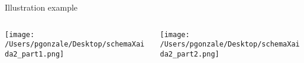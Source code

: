 \documentclass[9pt,compress]{beamer}
\begin{document}
%
%
%
\begin{frame}{Illustration example}
{}
\begin{columns}
\begin{column}{0.5\textwidth}
\begin{center}
\texttt{[image: /Users/pgonzale/Desktop/schemaXaida2\_part1.png]}
 \end{center}  
 \end{column}
 \pause
 \begin{column}{0.5\textwidth}
\begin{center}
\texttt{[image: /Users/pgonzale/Desktop/schemaXaida2\_part2.png]}
 \end{center}    
 \end{column}
 \end{columns}
 
  
 \end{frame}
%
%
%
%
%
%

\end{document}
